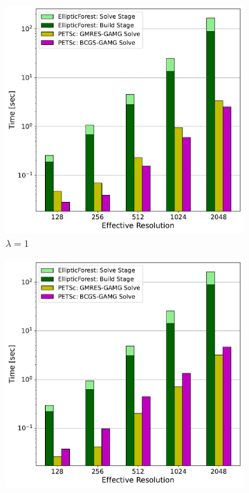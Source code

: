 \begin{figure}
    \centering
    \begin{subfigure}[t]{0.48\textwidth}
        \includegraphics[width=1\textwidth, clip=true, trim={0 0 0 0}]{figures/case03-l1-stacked-bar-plot-comparisons-no-title.pdf}
        \caption{$\lambda = 1$}
    \end{subfigure}
    \begin{subfigure}[t]{0.48\textwidth}
        \includegraphics[width=1\textwidth, clip=true, trim={0 0 0 0}]{figures/case03-l10-stacked-bar-plot-comparisons-no-title.pdf}

\end{subfigure}
\end{figure}
